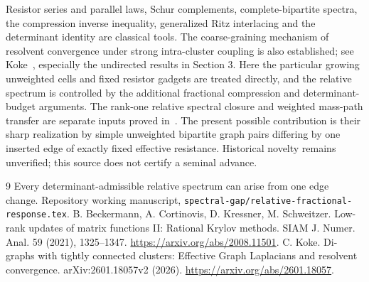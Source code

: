 \documentclass[11pt]{article}
\begin{document}
Resistor series and parallel laws, Schur complements, complete-bipartite
spectra, the compression inverse inequality, generalized Ritz
interlacing and the determinant identity are classical tools. The
coarse-graining mechanism of resolvent convergence under strong
intra-cluster coupling is also established; see Koke~\cite{Koke},
especially the undirected results in Section 3. Here the particular
growing unweighted cells and fixed resistor gadgets are treated
directly, and the relative spectrum is controlled by the additional
fractional compression and determinant-budget arguments.
The
rank-one relative spectral closure and weighted mass-path transfer
are separate inputs proved in~\cite{Relative}.
The present possible contribution is their sharp realization by
simple unweighted bipartite graph pairs differing by one inserted
edge of exactly fixed effective resistance. Historical novelty
remains unverified; this source does not certify a seminal advance.

\begin{thebibliography}{9}
 Every determinant-admissible relative spectrum can arise
from one edge change. Repository working manuscript,
\texttt{spectral-gap/relative-fractional-response.tex}.
 B. Beckermann, A. Cortinovis, D. Kressner, M. Schweitzer.
Low-rank updates of matrix functions II: Rational Krylov methods.
SIAM J. Numer. Anal. 59 (2021), 1325--1347.
\url{https://arxiv.org/abs/2008.11501}.
 C. Koke.
Di-graphs with tightly connected clusters: Effective Graph Laplacians
and resolvent convergence. arXiv:2601.18057v2 (2026).
\url{https://arxiv.org/abs/2601.18057}.
\end{thebibliography}
\end{document}
